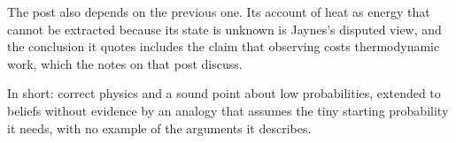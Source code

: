 \begin{afterword}
The post also depends on the previous one. Its account of heat as energy that cannot be extracted because its state is unknown is Jaynes's disputed view, and the conclusion it quotes includes the claim that observing costs thermodynamic work, which the notes on that post discuss.

In short: correct physics and a sound point about low probabilities, extended to beliefs without evidence by an analogy that assumes the tiny starting probability it needs, with no example of the arguments it describes.
\end{afterword}
